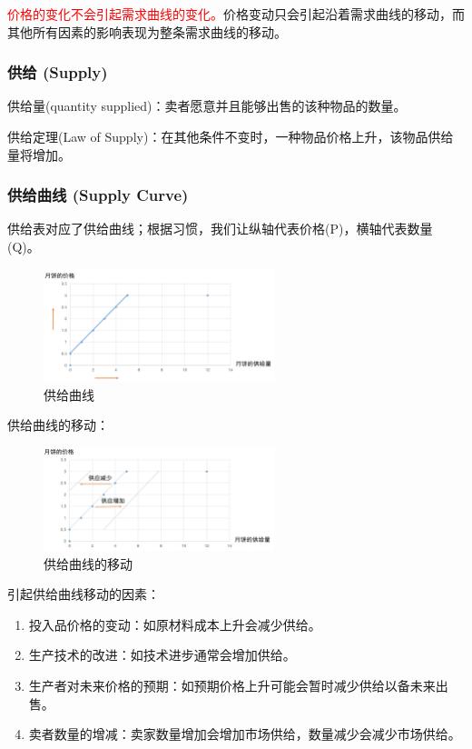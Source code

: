 \documentclass[12pt, a4paper]{article}
\begin{document}
\textcolor{red}{价格的变化不会引起需求曲线的变化。}价格变动只会引起沿着需求曲线的移动，而其他所有因素的影响表现为整条需求曲线的移动。

\subsubsection{供给 (Supply)}
供给量(quantity supplied)：卖者愿意并且能够出售的该种物品的数量。

供给定理(Law of Supply)：在其他条件不变时，一种物品价格上升，该物品供给量将增加。

\subsubsection{供给曲线 (Supply Curve)}
供给表对应了供给曲线；根据习惯，我们让纵轴代表价格(P)，横轴代表数量(Q)。

\begin{figure}[H]
  \centering
  \includegraphics[width=0.6\textwidth]{供给曲线.png}
  \caption{供给曲线}
\end{figure}

供给曲线的移动：

\begin{figure}[H]
  \centering
  \includegraphics[width=0.6\textwidth]{供给曲线的移动.png}
  \caption{供给曲线的移动}
\end{figure}

引起供给曲线移动的因素：
\begin{enumerate}
    \item 投入品价格的变动：如原材料成本上升会减少供给。
    \item 生产技术的改进：如技术进步通常会增加供给。
    \item 生产者对未来价格的预期：如预期价格上升可能会暂时减少供给以备未来出售。
    \item 卖者数量的增减：卖家数量增加会增加市场供给，数量减少会减少市场供给。
\end{enumerate}
\end{document}
